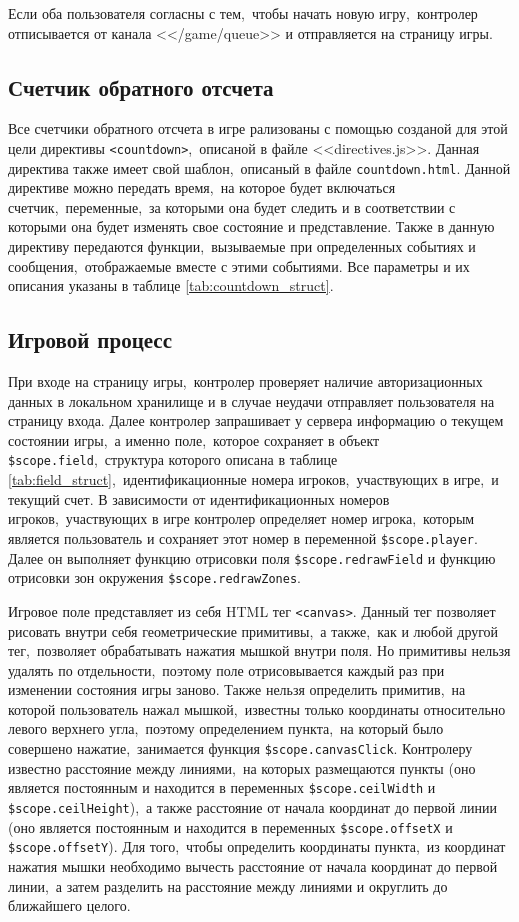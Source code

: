 \documentclass[14pt,a4paper]{report}
\begin{document}
Если оба пользователя согласны с тем,~чтобы начать новую игру,~контролер отписывается от канала <</game/queue>> и отправляется на страницу игры.

\subsection{Счетчик обратного отсчета}
Все счетчики обратного отсчета в игре рализованы с помощью созданой для этой цели директивы \lstinline{<countdown>},~описаной в файле <<directives.js>>. Данная директива также имеет свой шаблон,~описаный в файле \lstinline{countdown.html}. Данной директиве можно передать время,~на которое будет включаться счетчик,~переменные,~за которыми она будет следить и в соответствии с которыми она будет изменять свое состояние и представление. Также в данную директиву передаются функции,~вызываемые при определенных событиях и сообщения,~отображаемые вместе с этими событиями. Все параметры и их описания указаны в таблице \ref{tab:countdown_struct}.

\subsection{Игровой процесс}
При входе на страницу игры,~контролер проверяет наличие авторизационных данных в локальном хранилище и в случае неудачи отправляет пользователя на страницу входа. Далее контролер запрашивает у сервера информацию о текущем состоянии игры,~а именно поле,~которое сохраняет в объект \lstinline{$scope.field},~структура которого описана в таблице \ref{tab:field_struct},~идентификационные номера игроков,~участвующих в игре,~и текущий счет. В зависимости от идентификационных номеров игроков,~участвующих в игре контролер определяет номер игрока,~которым является пользователь и сохраняет этот номер в переменной \lstinline{$scope.player}. Далее он выполняет функцию отрисовки поля \lstinline{$scope.redrawField} и функцию отрисовки зон окружения \lstinline{$scope.redrawZones}.

Игровое поле представляет из себя HTML тег \lstinline{<canvas>}. Данный тег позволяет рисовать внутри себя геометрические примитивы,~а также,~как и любой другой тег,~позволяет обрабатывать нажатия мышкой внутри поля. Но примитивы нельзя удалять по отдельности,~поэтому поле отрисовывается каждый раз при изменении состояния игры заново. Также нельзя определить примитив,~на которой пользователь нажал мышкой,~известны только координаты относительно левого верхнего угла,~поэтому определением пункта,~на который было совершено нажатие,~занимается функция \lstinline{$scope.canvasClick}. Контролеру известно расстояние между линиями,~на которых размещаются пункты (оно является постоянным и находится в переменных \lstinline{$scope.ceilWidth} и \lstinline{$scope.ceilHeight}),~а также расстояние от начала координат до первой линии (оно является постоянным и находится в переменных \lstinline{$scope.offsetX} и \lstinline{$scope.offsetY}). Для того,~чтобы определить координаты пункта,~из координат нажатия мышки необходимо вычесть расстояние от начала координат до первой линии,~а затем разделить на расстояние между линиями и округлить до ближайшего целого.
\end{document}
